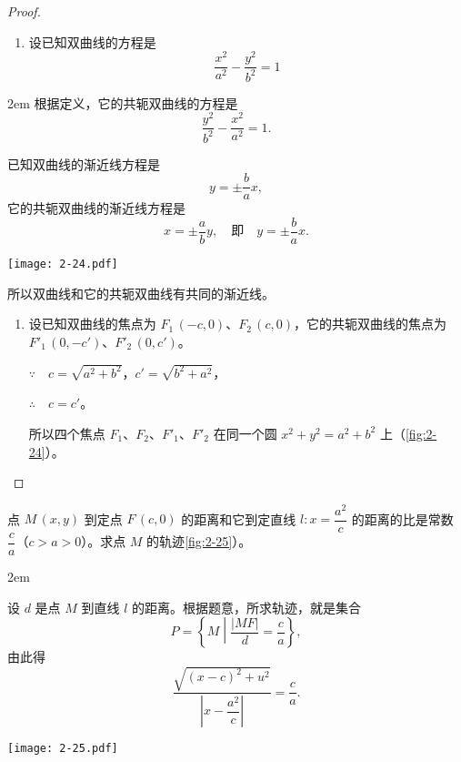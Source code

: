 \begin{proof}
  \begin{enumerate}
    \item 设已知双曲线的方程是
    \[\frac{x^2}{a^2}-\frac{y^2}{b^2}=1\]
  \end{enumerate}
  \begin{minipage}{0.5\linewidth}\parindent2em
    \noindent 根据定义，它的共轭双曲线的方程是
    \[\frac{y^2}{b^2}-\frac{x^2}{a^2}=1.\]

    已知双曲线的渐近线方程是
    \[y=\pm\frac{b}{a}x,\]
    它的共轭双曲线的渐近线方程是
    \[x=\pm\frac{a}{b}y,\quad\text{即}\quad y=\pm\frac{b}{a}x.\]
  \end{minipage}\hfill
  \begin{minipage}{0.45\linewidth}\centering
    \begin{figurehere}
      \texttt{[image: 2-24.pdf]}
      \caption{}\label{fig:2-24}
    \end{figurehere}
  \end{minipage}\par\medskip 
  所以双曲线和它的共轭双曲线有共同的渐近线。
  \begin{enumerate}[resume]
    \item 设已知双曲线的焦点为 $F_1\,(-c,0)$、$F_2\,(c,0)$，它的共轭双曲线的焦点为 $F'_1\,(0,-c')$、$F'_2\,(0,c')$。
    
    $\because \quad c=\sqrt{a^2+b^2}$，$c'=\sqrt{b^2+a^2}$，

    $\therefore \quad c=c'$。
    
    所以四个焦点 $F_1$、$F_2$、$F'_1$、$F'_2$ 在同一个圆 $x^2+y^2=a^2+b^2$ 上（\cref{fig:2-24}）。
  \end{enumerate}
\end{proof}
\begin{example}
  点 $M\,(x,y)$ 到定点 $F\,(c,0)$ 的距离和它到定直线 $l:x=\dfrac{a^2}{c}$ 的距离的比是常数 $\dfrac{c}{a}$（$c>a>0$）。求点 $M$ 的轨迹\cref{fig:2-25}）。
\end{example}

\noindent
\begin{minipage}{0.55\linewidth}\parindent2em
\begin{solution}
  设 $d$ 是点 $M$ 到直线 $l$ 的距离。根据题意，所求轨迹，就是集合
  \[P=\left\{ M \middle\vert \frac{|MF|}{d}=\frac{c}{a} \right\},\]
  由此得
  \[ \frac{\sqrt{(x-c)^2+u^2}}{\left|x-\dfrac{a^2}{c}\right|}=\frac{c}{a}.\]
\end{solution}
\end{minipage}\hfill
\begin{minipage}{0.4\linewidth}\centering
  \begin{figurehere}
    \texttt{[image: 2-25.pdf]}
    \caption{}\label{fig:2-25}
  \end{figurehere}
\end{minipage}

